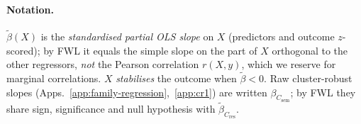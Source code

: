 \documentclass[10pt,twocolumn,letterpaper]{article}
\newcommand{\Csem}{C_{\mathrm{sem}}}
\newcommand{\Cprompt}{C_{\mathrm{prompt}}}
\newcommand{\Cres}{C_{\mathrm{res}}}
\newcommand{\Hopt}{H_{\mathrm{opt}}}
\begin{document}
% 

% 
\paragraph{Notation.} $\tilde\beta(X)$ is the \emph{standardised partial OLS slope} on $X$ (predictors and outcome $z$-scored); by FWL it equals the simple slope on the part of $X$ orthogonal to the other regressors, \emph{not} the Pearson correlation $r(X,y)$, which we reserve for marginal correlations. $X$ \emph{stabilises} the outcome when $\tilde\beta < 0$. Raw cluster-robust slopes (Apps.~\ref{app:family-regression},~\ref{app:cr1}) are written $\beta_{\Csem}$; by FWL they share sign, significance and null hypothesis with $\tilde\beta_{\Cres}$.
% 
\end{document}

